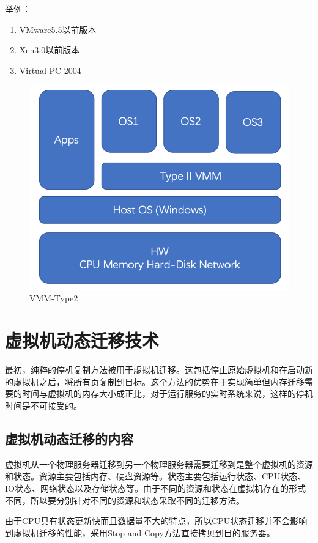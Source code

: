 举例：
\begin{enumerate}
    \item VMware5.5以前版本
    \item Xen3.0以前版本
    \item Virtual PC 2004
\end{enumerate}

\begin{figure}[ht]
  \centering
  \includegraphics{./Figure/IMG_Chap2_3.png}
  \caption{VMM-Type2}\label{Fig:chap2_3}
\end{figure}

\section{虚拟机动态迁移技术}
最初，纯粹的停机复制方法被用于虚拟机迁移。这包括停止原始虚拟机和在启动新的虚拟机之后，将所有页复制到目标。这个方法的优势在于实现简单但内存迁移需要的时间与虚拟机的内存大小成正比，对于运行服务的实时系统来说，这样的停机时间是不可接受的。

\subsection{虚拟机动态迁移的内容}
虚拟机从一个物理服务器迁移到另一个物理服务器需要迁移到是整个虚拟机的资源和状态。资源主要包括内存、硬盘资源等。状态主要包括运行状态、CPU状态、IO状态、网络状态以及存储状态等。由于不同的资源和状态在虚拟机存在的形式不同，所以要分别针对不同的资源和状态采取不同的迁移方法。

由于CPU具有状态更新快而且数据量不大的特点，所以CPU状态迁移并不会影响到虚拟机迁移的性能，采用Stop-and-Copy方法直接拷贝到目的服务器。

